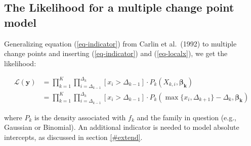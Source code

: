 \documentclass[
  american,
]{article}
\begin{document}
\hypertarget{the-likelihood-for-a-multiple-change-point-model}{%
\subsection{The Likelihood for a multiple change point model}\label{the-likelihood-for-a-multiple-change-point-model}}

Generalizing equation (\ref{eq-indicator}) from Carlin et al.~(1992) to multiple change points and inserting (\ref{eq-indicator}) and (\ref{eq-localx}), we get the likelihood:

\begin{equation}
\begin{aligned}
\mathcal{L}(\mathbf{y}) & = \prod_{k = 1}^K\prod_{i = \Delta_{k-1}}^{\Delta_k} [x_i > \Delta_{k-1}]\cdot P_k(X_{k, i}, \mathbf{\beta_k}) \\
                        & = \prod_{k = 1}^K\prod_{i = \Delta_{k-1}}^{\Delta_k} [x_i > \Delta_{k-1}]\cdot P_k(\max\{x_i, \Delta_{k+1}\} - \Delta_k, \mathbf{\beta_k})
\end{aligned}
\end{equation}

where \(P_k\) is the density associated with \(f_k\) and the family in question (e.g., Gaussian or Binomial). An additional indicator is needed to model absolute intercepts, as discussed in section \ref{#extend}.

\renewcommand\refname{References}
  
\end{document}
